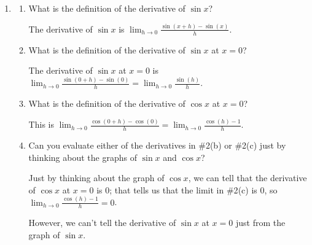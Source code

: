 \documentclass[main]{subfiles}
\begin{document}
\begin{enumerate}
\item 
  \begin{enumerate}
  \item
    \begin{problem}[\vfill]
      What is the definition of the derivative of $\sin x$?
    \end{problem}

    \begin{solution}
      The derivative of $\sin x$ is $\boxed{\lim_{h \to 0}
        \frac{\sin(x+h) - \sin(x)}{h}}$. 
    \end{solution}

  \item
    \begin{problem}[\vfill]
      What is the definition of the derivative of $\sin x$ at $x = 0$?
    \end{problem}

    \begin{solution}
      The derivative of $\sin x$ at $x = 0$ is $\displaystyle \lim_{h \to
        0} \frac{\sin(0 + h) - \sin(0)}{h} = \boxed{\lim_{h \to 0}
        \frac{\sin(h)}{h}}$.
    \end{solution}

  \item
    \begin{problem}[\vfill]
      What is the definition of the derivative of $\cos x$ at $x = 0$?
    \end{problem}

    \begin{solution}
      This is $\displaystyle \lim_{h \to 0} \frac{\cos(0 + h) -
        \cos(0)}{h} = \boxed{\lim_{h \to 0} \frac{\cos(h) - 1}{h}}$.
    \end{solution}

  \item
    \begin{problem}[\vfill]
      Can you evaluate either of the derivatives in
      {{{{\#2}}(b)}} or
      {{{{\#2}}(c)}} just by thinking about the
      graphs of $\sin x$ and $\cos x$?
    \end{problem}

    \begin{solution}
      Just by thinking about the graph of $\cos x$, we can tell that the
      derivative of $\cos x$ at $x = 0$ is $0$; that tells us that the
      limit in {{{{\#2}}(c)}} is 0, so
      $\boxed{\lim_{h \to 0} \frac{\cos(h) - 1}{h} = 0}$.

      However, we can't tell the derivative of $\sin x$ at $x = 0$ just
      from the graph of $\sin x$. 
    \end{solution}


\end{enumerate}
\end{enumerate}
\end{document}
